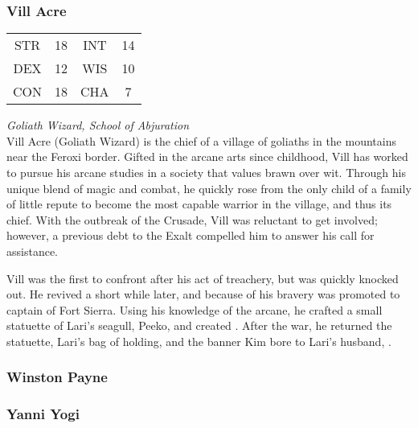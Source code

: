 \subsubsection{Vill Acre}
\label{people:vill}
\begin{center}
\begin{tabular}{c c|c c}
STR & 18 & INT & 14 \\
DEX & 12 & WIS & 10 \\
CON & 18 & CHA & 7 \end{tabular}\end{center}
\textit{Goliath Wizard, School of Abjuration}\\

Vill Acre (Goliath Wizard) is the chief of a village of goliaths in the mountains near the Feroxi border. Gifted in the arcane arts since childhood, Vill has worked to pursue his arcane studies in a society that values brawn over wit. Through his unique blend of magic and combat, he quickly rose from the only child of a family of little repute to become the most capable warrior in the village, and thus its chief. With the outbreak of the Crusade, Vill was reluctant to get involved; however, a previous debt to the Exalt compelled him to answer his call for assistance.

Vill was the first to confront  after his act of treachery, but was quickly knocked out. He revived a short while later, and because of his bravery was promoted to captain of Fort Sierra. Using his knowledge of the arcane, he crafted a small statuette of Lari's seagull, Peeko, and created . After the war, he returned the statuette, Lari's bag of holding, and the banner Kim bore to Lari's husband, .

\subsubsection{Winston Payne}
\label{people:wpayne}


\subsubsection{Yanni Yogi}
\label{people:yogi}
